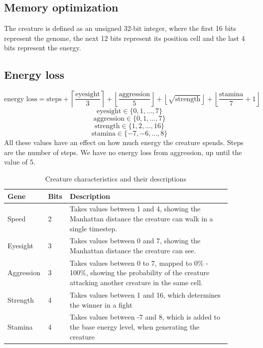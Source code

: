 \documentclass{article}
\begin{document}
\subsection{Memory optimization}
The creature is defined as an unsigned 32-bit integer, where the first 16 bits represent the genome, the next 12 bits represent its position cell and the last 4 bits represent the energy.
\subsection{Energy loss}
\[\text{energy loss}=\text{steps}+\left\lceil\frac{\text{eyesight}}{3}\right\rceil+\left\lfloor\frac{\text{aggression}}{5}\right\rfloor+\left\lfloor\sqrt{\text{strength}}\right\rfloor+\left\lfloor\frac{\text{stamina}}{7}+1\right\rfloor\]
\[\text{eyesight}\in\{0,1,...,7\}\]
\[\text{aggression}\in\{0,1,...,7\}\]
\[\text{strength}\in\{1,2,...,16\}\]
\[\text{stamina}\in\{-7,-6,...,8\}\]
All these values have an effect on how much energy the creature spends. Steps are the number of steps. We have no energy loss from aggression, up until the value of 5.
\begin{table}[H]
\begin{center}
    \begin{tabular}{|p{0.11\linewidth} |p{0.08\linewidth}|p{0.7\linewidth}|}
    \hline
    Gene & Bits & Description  \\\hline
    Speed & 2 & Takes values between 1 and 4, showing the Manhattan distance the creature can walk in a single timestep.\\\hline
    Eyesight & 3 & Takes values between 0 and 7, showing the Manhattan distance the creature can see.\\\hline
    Aggression & 3 & Takes values between 0 to 7, mapped to 0\% - 100\%, showing the probability of the creature attacking another creature in the same cell. \\\hline
    Strength & 4 & Takes values between 1 and 16, which determines the winner in a fight \\\hline
    Stamina & 4 & Takes values between -7 and 8, which is added to the base energy level, when generating the creature\\\hline
\end{tabular}
\caption{Creature characteristics and their descriptions}
\end{center}
\end{table}
\end{document}
